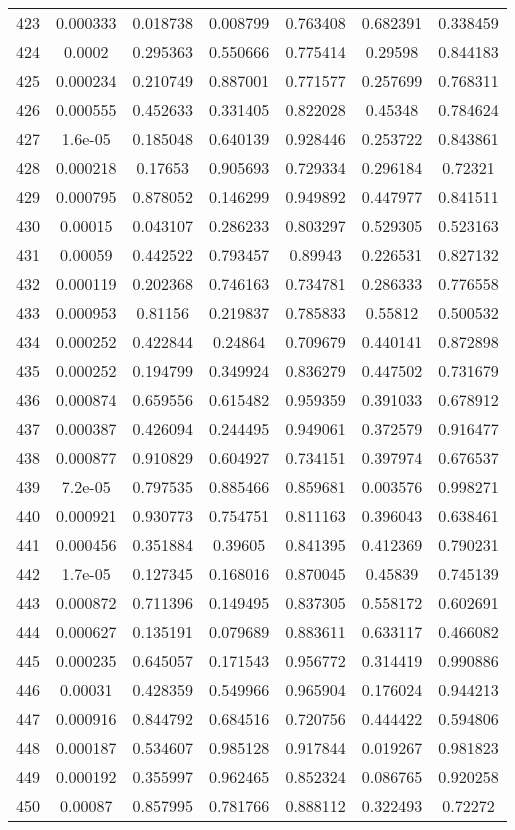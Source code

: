 \begin{table}
\begin{tabular}{c|c|c|c|c|c|c}
423 & 0.000333 & 0.018738 & 0.008799 & 0.763408 & 0.682391 & 0.338459\\
424 & 0.0002 & 0.295363 & 0.550666 & 0.775414 & 0.29598 & 0.844183\\
425 & 0.000234 & 0.210749 & 0.887001 & 0.771577 & 0.257699 & 0.768311\\
426 & 0.000555 & 0.452633 & 0.331405 & 0.822028 & 0.45348 & 0.784624\\
427 & 1.6e-05 & 0.185048 & 0.640139 & 0.928446 & 0.253722 & 0.843861\\
428 & 0.000218 & 0.17653 & 0.905693 & 0.729334 & 0.296184 & 0.72321\\
429 & 0.000795 & 0.878052 & 0.146299 & 0.949892 & 0.447977 & 0.841511\\
430 & 0.00015 & 0.043107 & 0.286233 & 0.803297 & 0.529305 & 0.523163\\
431 & 0.00059 & 0.442522 & 0.793457 & 0.89943 & 0.226531 & 0.827132\\
432 & 0.000119 & 0.202368 & 0.746163 & 0.734781 & 0.286333 & 0.776558\\
433 & 0.000953 & 0.81156 & 0.219837 & 0.785833 & 0.55812 & 0.500532\\
434 & 0.000252 & 0.422844 & 0.24864 & 0.709679 & 0.440141 & 0.872898\\
435 & 0.000252 & 0.194799 & 0.349924 & 0.836279 & 0.447502 & 0.731679\\
436 & 0.000874 & 0.659556 & 0.615482 & 0.959359 & 0.391033 & 0.678912\\
437 & 0.000387 & 0.426094 & 0.244495 & 0.949061 & 0.372579 & 0.916477\\
438 & 0.000877 & 0.910829 & 0.604927 & 0.734151 & 0.397974 & 0.676537\\
439 & 7.2e-05 & 0.797535 & 0.885466 & 0.859681 & 0.003576 & 0.998271\\
440 & 0.000921 & 0.930773 & 0.754751 & 0.811163 & 0.396043 & 0.638461\\
441 & 0.000456 & 0.351884 & 0.39605 & 0.841395 & 0.412369 & 0.790231\\
442 & 1.7e-05 & 0.127345 & 0.168016 & 0.870045 & 0.45839 & 0.745139\\
443 & 0.000872 & 0.711396 & 0.149495 & 0.837305 & 0.558172 & 0.602691\\
444 & 0.000627 & 0.135191 & 0.079689 & 0.883611 & 0.633117 & 0.466082\\
445 & 0.000235 & 0.645057 & 0.171543 & 0.956772 & 0.314419 & 0.990886\\
446 & 0.00031 & 0.428359 & 0.549966 & 0.965904 & 0.176024 & 0.944213\\
447 & 0.000916 & 0.844792 & 0.684516 & 0.720756 & 0.444422 & 0.594806\\
448 & 0.000187 & 0.534607 & 0.985128 & 0.917844 & 0.019267 & 0.981823\\
449 & 0.000192 & 0.355997 & 0.962465 & 0.852324 & 0.086765 & 0.920258\\
450 & 0.00087 & 0.857995 & 0.781766 & 0.888112 & 0.322493 & 0.72272\\
\end{tabular}
\end{table}
